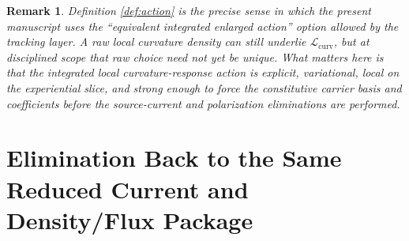 \documentclass[11pt]{article}
\newtheorem{remark}{Remark}
\begin{document}
\begin{remark}
Definition \ref{def:action} is the precise sense in which the present manuscript uses the ``equivalent integrated enlarged action'' option allowed by the tracking layer. A raw local curvature density can still underlie \(\mathcal L_{\mathrm{curv}}\), but at disciplined scope that raw choice need not yet be unique. What matters here is that the integrated local curvature-response action is explicit, variational, local on the experiential slice, and strong enough to force the constitutive carrier basis and coefficients before the source-current and polarization eliminations are performed.
\end{remark}

\section{Elimination Back to the Same Reduced Current and Density/Flux Package}
\end{document}
